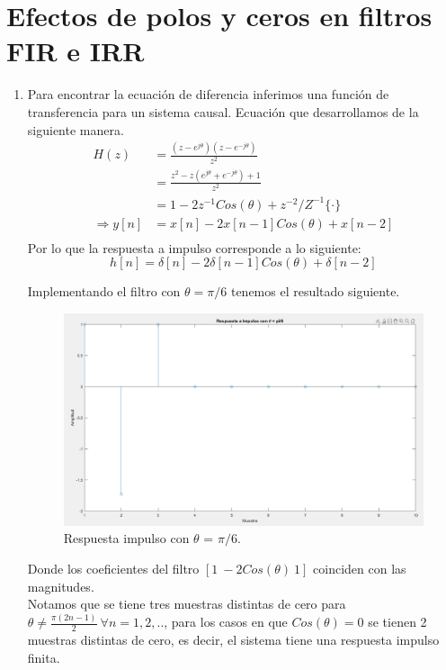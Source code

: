\documentclass[letterpaper,onecolumn,10pt,journal,final]{IEEEtran}
\begin{document}
\section{Efectos de polos y ceros en filtros FIR e IRR}
\begin{enumerate}[1)]
    \item %
    Para encontrar la ecuación de diferencia inferimos una función de transferencia para un sistema causal. Ecuación que desarrollamos de la siguiente manera.
    \begin{equation*}
    \begin{split}
        H(z) &= \frac{(z - e^{j \theta})(z - e^{-j \theta})}{z^2} \\
        &= \frac{z^2 -z( e^{j \theta } + e ^{ -j \theta }) + 1}{ z^2} \\
        &= 1 - 2 z^ {-1}  Cos (\theta) + z^{-2} / Z^{-1} \{ \cdot \}  \\
        \Rightarrow y[n] &=  x[n] -2x[n-1]Cos(\theta)+x[n-2] \\
    \end{split}
    \end{equation*}
    Por lo que la respuesta a impulso corresponde a lo siguiente:
    \begin{equation*}
        h[n] =  \delta [n] -2\delta [n-1]Cos(\theta)+\delta [n-2]
    \end{equation*}
    
    Implementando el filtro con $\theta = \pi /6$ tenemos el resultado siguiente.
    \begin{figure}[H]
        \centering
        \includegraphics[width=0.75 \linewidth]{Figuras/I_1)_RespuestaImpulso.png}
        \caption{Respuesta impulso con $\theta$ = $\pi /6$.}
        \label{fig:I1}
    \end{figure}
    Donde los coeficientes del filtro $[1~-2Cos( \theta )~1]$ coinciden con las magnitudes.\\ 
    Notamos que se tiene tres muestras distintas de cero para $\theta \neq \frac{\pi (2n - 1) }{2} ~ \forall n = 1, 2, ..$, para los casos en que $Cos( \theta )  = 0 $ se tienen 2 muestras distintas de cero, es decir, el sistema tiene una respuesta impulso finita. \\[0.5 cm]
    

\end{enumerate}
\end{document}
